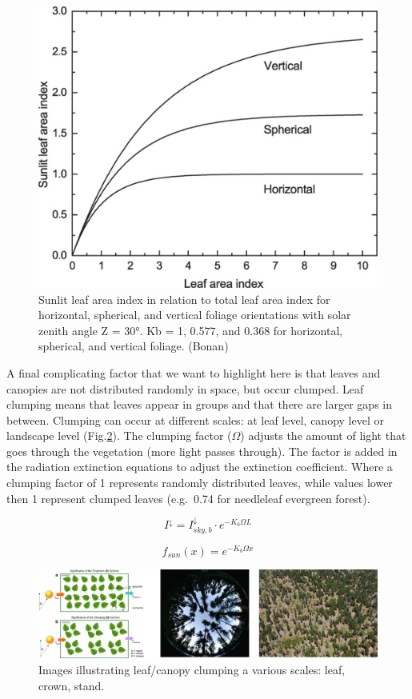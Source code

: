 \documentclass[12pt,oneside]{book}
\begin{document}
\begin{figure}

{\centering \includegraphics[width=0.8\linewidth]{figures/chap3/f314_sunlit} 

}

\caption{Sunlit leaf area index in relation to total leaf area index for horizontal, spherical, and vertical foliage orientations with solar zenith angle Ζ = 30°. Kb = 1, 0.577, and 0.368 for horizontal, spherical, and vertical foliage. (Bonan)}\label{fig:f314}
\end{figure}

A final complicating factor that we want to highlight here is that
leaves and canopies are not distributed randomly in space, but occur
clumped. Leaf clumping means that leaves appear in groups and that there
are larger gaps in between. Clumping can occur at different scales: at
leaf level, canopy level or landscape level (Fig.\ref{fig:f315}). The
clumping factor (\(\Omega\)) adjusts the amount of light that goes
through the vegetation (more light passes through). The factor is added
in the radiation extinction equations to adjust the extinction
coefficient. Where a clumping factor of 1 represents randomly
distributed leaves, while values lower then 1 represent clumped leaves
(e.g.~0.74 for needleleaf evergreen forest).

\[
I^{\downarrow} = I^{\downarrow}_{sky,b}\cdot e^{-K_b \Omega L}
\]

\[
f_{sun} (x) = e^{-K_b \Omega x}
\]

\begin{figure}

{\centering \includegraphics[width=0.8\linewidth]{figures/chap3/f315_clumping} 

}

\caption{Images illustrating leaf/canopy clumping a various scales: leaf, crown, stand.}\label{fig:f315}
\end{figure}
\end{document}
